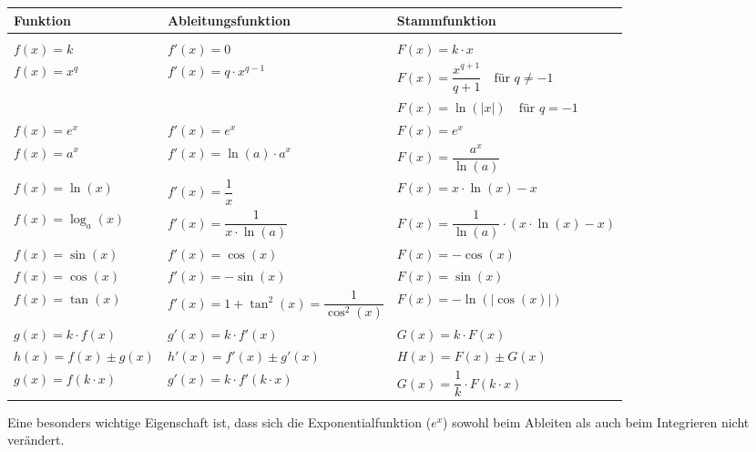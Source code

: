 \begin{center}
\begin{tabular}{lll}
\textbf{Funktion} & \textbf{Ableitungsfunktion} & \textbf{Stammfunktion} \\
\hline\\[-8pt]  %
$f(x) = k$ 
  & $f'(x) = 0$ 
  & $F(x) = k \cdot x$ \\[4pt]

$f(x) = x^{q}$ 
  & $f'(x) = q \cdot x^{q-1}$ 
  & $F(x) = \dfrac{x^{q+1}}{q+1} \quad \text{für } q \neq -1$ \\[4pt]

 &  & $F(x) = \ln(|x|) \quad \text{für } q = -1$ \\[4pt]

$f(x) = e^{x}$ 
  & $f'(x) = e^{x}$ 
  & $F(x) = e^{x}$ \\[4pt]

$f(x) = a^{x}$ 
  & $f'(x) = \ln(a)\cdot a^{x}$ 
  & $F(x) = \dfrac{a^{x}}{\ln(a)}$ \\[4pt]

$f(x) = \ln(x)$ 
  & $f'(x) = \dfrac{1}{x}$ 
  & $F(x) = x\cdot \ln(x) - x$ \\[4pt]

$f(x) = \log_{a}(x)$ 
  & $f'(x) = \dfrac{1}{x\cdot \ln(a)}$ 
  & $F(x) = \dfrac{1}{\ln(a)}\cdot (x\cdot \ln(x) - x)$ \\[4pt]

$f(x) = \sin(x)$ 
  & $f'(x) = \cos(x)$ 
  & $F(x) = -\cos(x)$ \\[4pt]

$f(x) = \cos(x)$ 
  & $f'(x) = -\sin(x)$ 
  & $F(x) = \sin(x)$ \\[4pt]

$f(x) = \tan(x)$ 
  & $f'(x) = 1 + \tan^{2}(x) = \dfrac{1}{\cos^{2}(x)}$ 
  & $F(x) = -\ln(|\cos(x)|)$ \\[4pt]

$g(x) = k \cdot f(x)$ 
  & $g'(x) = k \cdot f'(x)$ 
  & $G(x) = k \cdot F(x)$ \\[4pt]

$h(x) = f(x) \pm g(x)$ 
  & $h'(x) = f'(x) \pm g'(x)$ 
  & $H(x) = F(x) \pm G(x)$ \\[4pt]

$g(x) = f(k \cdot x)$ 
  & $g'(x) = k \cdot f'(k \cdot x)$ 
  & $G(x) = \dfrac{1}{k}\cdot F(k \cdot x)$ \\
\end{tabular}
\end{center}
\vspace{10pt}
\noindent
Eine besonders wichtige Eigenschaft ist, dass sich die Exponentialfunktion ($e^x$) sowohl beim Ableiten als auch beim Integrieren nicht verändert.

